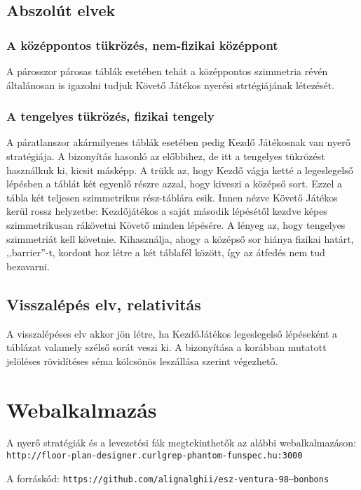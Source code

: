 \documentclass{article}
\begin{document}
		\subsection{Abszolút elvek}
			\subsubsection{A középpontos tükrözés, nem-fizikai középpont}
			A párosszor párosas táblák esetében tehát a középpontos szimmetria révén általánosan is igazolni tudjuk Követő Játékos nyerési strtégiájának létezését.
			\subsubsection{A tengelyes tükrözés, fizikai tengely}
			A páratlanszor akármilyenes táblák esetében pedig Kezdő Játékosnak van nyerő stratégiája. A bizonyítás hasonló az előbbihez, de itt a tengelyes tükrözést használkuk ki, kicsit másképp. A trükk az, hogy Kezdő vágja ketté a legeslegelső lépésben a táblát két egyenlő részre azzal, hogy kiveszi a középső sort. Ezzel a tábla két teljesen szimmetrikus rész-táblára esik. Innen nézve Követő Játékos kerül rossz helyzetbe: Kezdőjátékos a saját második lépésétől  kezdve képes szimmetrikusan rákövetni Követő minden lépésére. A lényeg az, hogy tengelyes szimmetriát kell követnie. Kihasználja, ahogy a középső sor hiánya fizikai határt, ,,barrier''-t, kordont hoz létre a két táblafél között, így az átfedés nem tud bezavarni.
		\subsection{Visszalépés elv, relativitás}
		A visszalépéses elv akkor jön létre, ha KezdőJátékos legeslegelső lépéseként a táblázat valamely szélső sorát veszi ki. A bizonyítása a korábban mutatott jelöléses rövidítéses séma kölcsönös leszállása szerint végezhető.
	\section{Webalkalmazás}

		A nyerő stratégiák és a levezetési fák megtekinthetők az alábbi webalkalmazáson: \texttt{http://floor-plan-designer.curlgrep-phantom-funspec.hu:3000}

		A forráskód: \texttt{https://github.com/alignalghii/esz-ventura-98--bonbons}
\end{document}
